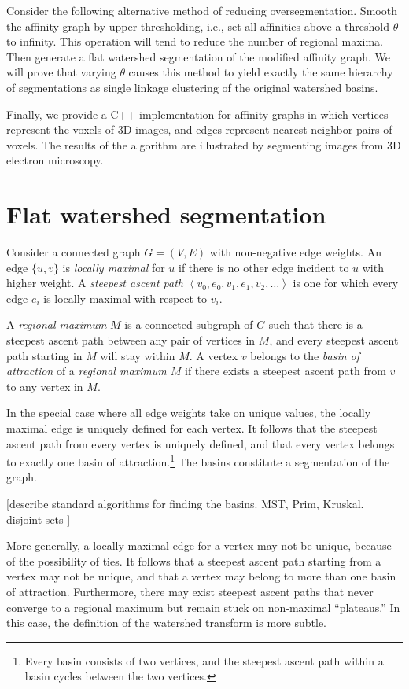 \documentclass{article}
\begin{document}
Consider the following alternative method of reducing
oversegmentation.  Smooth the affinity graph by upper thresholding,
i.e., set all affinities above a threshold $\theta$ to infinity.  This
operation will tend to reduce the number of regional maxima.  Then
generate a flat watershed segmentation of the modified affinity graph.
We will prove that varying $\theta$ causes this method to yield
exactly the same hierarchy of segmentations as single linkage
clustering of the original watershed basins.

Finally, we provide a C++ implementation for affinity graphs in which
vertices represent the voxels of 3D images, and edges represent
nearest neighbor pairs of voxels.  The results of the algorithm are
illustrated by segmenting images from 3D electron microscopy.

\section{Flat watershed segmentation}
Consider a connected graph $G=(V,E)$ with non-negative edge
weights. An edge $\{u,v\}$ is \emph{locally maximal} for
$u$ if there is no other edge incident to $u$ with higher weight.  A
\emph{steepest ascent path} $\left\langle
v_{0},e_{0},v_{1},e_{1},v_{2}, \dots \right\rangle$ is one
for which every edge $e_{i}$ is locally maximal with respect to
$v_{i}.$

A \emph{regional maximum} $M$ is a connected subgraph of $G$ such that
there is a steepest ascent path between any pair of vertices in $M$,
and every steepest ascent path starting in $M$ will
stay within $M$. A vertex $v$ belongs to the \emph{basin of
  attraction} of a \emph{regional maximum $M$} if there exists a
steepest ascent path from $v$ to any vertex in $M$.

In the special case where all edge weights take on unique values, the
locally maximal edge is uniquely defined for each vertex.  It follows
that the steepest ascent path from every vertex is uniquely defined,
and that every vertex belongs to exactly one basin of
attraction.\footnote{Every basin consists of two vertices, and the
  steepest ascent path within a basin cycles between the two
  vertices.}  The basins constitute a segmentation of the graph.

[describe standard algorithms for finding the basins.  MST, Prim, Kruskal. disjoint sets ]

More generally, a locally maximal edge for a vertex may not be unique,
because of the possibility of ties.  It follows that a steepest
ascent path starting from a vertex may not be unique, and that a
vertex may belong to more than one basin of attraction.  Furthermore,
there may exist steepest ascent paths that never converge to a
regional maximum but remain stuck on non-maximal ``plateaus.''  In
this case, the definition of the watershed transform is more subtle.
\end{document}
